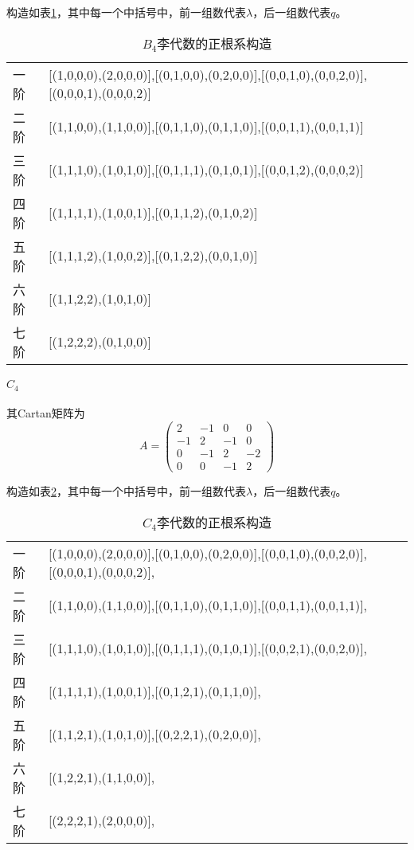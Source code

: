 \documentclass{ctexart}
\begin{document}
	构造如表\ref{table:B4Roots}，其中每一个中括号中，前一组数代表$\lambda$，后一组数代表$q$。
	
	\begin{table}[!htbp]
		\centering
		\begin{tabular}{ll}
			一阶 & [(1,0,0,0),(2,0,0,0)],[(0,1,0,0),(0,2,0,0)],[(0,0,1,0),(0,0,2,0)],[(0,0,0,1),(0,0,0,2)]\\
			二阶 & [(1,1,0,0),(1,1,0,0)],[(0,1,1,0),(0,1,1,0)],[(0,0,1,1),(0,0,1,1)] \\
			三阶 & [(1,1,1,0),(1,0,1,0)],[(0,1,1,1),(0,1,0,1)],[(0,0,1,2),(0,0,0,2)] \\
			四阶 & [(1,1,1,1),(1,0,0,1)],[(0,1,1,2),(0,1,0,2)] \\
			五阶 & [(1,1,1,2),(1,0,0,2)],[(0,1,2,2),(0,0,1,0)] \\
			六阶 & [(1,1,2,2),(1,0,1,0)]\\
			七阶 & [(1,2,2,2),(0,1,0,0)]
		\end{tabular}
		\caption{$B_4$李代数的正根系构造}
		\label{table:B4Roots}
	\end{table}

	
	
	\paragraph{$C_4$} 其Cartan矩阵为
	\begin{equation}
	A=
	\begin{pmatrix}
	2 & -1 & 0 & 0\\
	-1 & 2 & -1 & 0 \\
	0 & -1 & 2 & -2 \\
	0 & 0 & -1 & 2
	\end{pmatrix}
	\end{equation}
	
	构造如表\ref{table:C4Roots}，其中每一个中括号中，前一组数代表$\lambda$，后一组数代表$q$。
	
	\begin{table}[!htbp]
		\centering
		\begin{tabular}{ll}
			一阶 & [(1,0,0,0),(2,0,0,0)],[(0,1,0,0),(0,2,0,0)],[(0,0,1,0),(0,0,2,0)],[(0,0,0,1),(0,0,0,2)], \\
			二阶 & [(1,1,0,0),(1,1,0,0)],[(0,1,1,0),(0,1,1,0)],[(0,0,1,1),(0,0,1,1)], \\
			三阶 & [(1,1,1,0),(1,0,1,0)],[(0,1,1,1),(0,1,0,1)],[(0,0,2,1),(0,0,2,0)], \\
			四阶 & [(1,1,1,1),(1,0,0,1)],[(0,1,2,1),(0,1,1,0)], \\
			五阶 & [(1,1,2,1),(1,0,1,0)],[(0,2,2,1),(0,2,0,0)], \\
			六阶 & [(1,2,2,1),(1,1,0,0)], \\
			七阶 & [(2,2,2,1),(2,0,0,0)], \\
		\end{tabular}
		\caption{$C_4$李代数的正根系构造}
		\label{table:C4Roots}
	\end{table}
\end{document}
